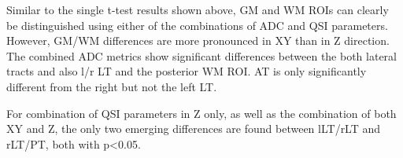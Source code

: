 Similar to the single t-test results shown above, GM and WM \glspl{ROI} can clearly be distinguished using either of the combinations of \gls{ADC} and \gls{QSI} parameters. However, GM/WM differences are more pronounced in XY than in Z direction. The combined ADC metrics show significant differences between the both lateral tracts and also l/r LT and the posterior WM \gls{ROI}. AT is only significantly different from the right but not the left LT.

For combination of \gls{QSI} parameters in Z only, as well as the combination of both XY and Z, the only two emerging differences are found between lLT/rLT and rLT/PT, both with p<0.05.%

\begin{table}[H]
\begin{captionframe}
  \caption[Significance of pair-wise differences between SC tracts in diffusivities and QSI parameters.]{Significance of pair-wise differences between SC tracts in diffusivities and QSI parameters (confidence interval: 95\%). Statistically significant differences are marked as follows: \textbf{bold} if p<0.05, \textbf{\emph{bold-italic}} if p<0.01.}	
  \label{tab:chap5exp1 single ttest}%
\end{captionframe}
\begin{tableframe}
\centering
	\footnotesize
\end{tableframe}
\end{table}
